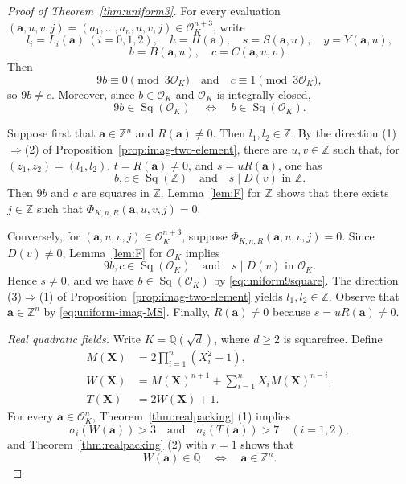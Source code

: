 \documentclass[12pt]{amsart}
\numberwithin{equation}{section}
\theoremstyle{remark}
\theoremstyle{plain}
\newcommand{\Z}{\mathbb{Z}}
\newcommand{\Q}{\mathbb{Q}}
\newcommand{\sO}{\mathcal{O}}
\newcommand{\bX}{\mathbf{X}}
\newcommand{\ba}{\mathbf{a}}
\newcommand{\Sq}[1]{\operatorname{Sq}(#1)}
\begin{document}
\begin{proof}[Proof of Theorem~\ref{thm:uniform3}]
For every evaluation $(\ba,u,v,j)=(a_1,\ldots,a_n,u,v,j)\in\sO_K^{n+3}$, write
\[
l_i=L_i(\ba)\ (i=0,1,2),\quad h=H(\ba),\quad s=S(\ba,u),\quad y=Y(\ba,u),
\]
\[
b=B(\ba,u),\quad c=C(\ba,u,v).
\]
Then
\[
9b\equiv0\pmod{3\sO_K}\quad\text{and}\quad c\equiv1\pmod{3\sO_K},
\]
so $9b\neq c$. Moreover, since $b\in\sO_K$ and $\sO_K$ is integrally closed,
\begin{equation}\label{eq:uniform9square}
9b\in\Sq{\sO_K}\quad\Longleftrightarrow\quad b\in\Sq{\sO_K}.
\end{equation}

Suppose first that $\ba\in\Z^n$ and $R(\ba)\neq0$. Then $l_1,l_2\in\Z$. By the direction \textup{(1)}$\Rightarrow$\textup{(2)} of Proposition~\ref{prop:imag-two-element}, there are $u,v\in\Z$ such that, for
$(z_1,z_2)=(l_1,l_2)$, $t=R(\ba)\neq0$, and $s=uR(\ba)$, one has
\[
b,c\in\Sq{\Z}\quad\text{and}\quad s\mid D(v)\text{ in }\Z.
\]
Then $9b$ and $c$ are squares in $\Z$. Lemma~\ref{lem:F} for $\Z$ shows that there exists $j\in\Z$ such
that $\Phi_{K,n,R}(\ba,u,v,j)=0$.

Conversely, for $(\ba,u,v,j)\in\sO_K^{n+3}$, suppose
$\Phi_{K,n,R}(\ba,u,v,j)=0$. Since $D(v)\neq0$, Lemma~\ref{lem:F} for $\sO_K$ implies
\[
9b,c\in\Sq{\sO_K}\quad\text{and}\quad s\mid D(v)\text{ in }\sO_K.
\]
Hence $s\neq0$, and we have $b\in\Sq{\sO_K}$ by \eqref{eq:uniform9square}. The direction \textup{(3)$\Rightarrow$(1)} of Proposition~\ref{prop:imag-two-element} yields
$l_1,l_2\in\Z$. Observe that $\ba\in\Z^n$ by \eqref{eq:uniform-imag-MS}. Finally, $R(\ba)\neq0$ because $s=uR(\ba)\neq0$.

\smallskip

\noindent\emph{Real quadratic fields.}
Write $K=\Q(\sqrt{d})$, where $d\geq2$ is squarefree. Define
\begin{align*}
M(\bX)&=2\prod_{i=1}^n(X_i^2+1),\\
W(\bX)&=M(\bX)^{n+1}+\sum_{i=1}^nX_iM(\bX)^{n-i},\\
T(\bX)&=2W(\bX)+1.
\end{align*}
For every $\ba\in\sO_K^n$, Theorem~\ref{thm:realpacking} \textup{(1)} implies
\begin{equation}\label{eq:uniform-real-positive}
	\sigma_i(W(\ba))>3\quad\text{and}\quad\sigma_i(T(\ba))>7\quad(i=1,2),
\end{equation}
and Theorem~\ref{thm:realpacking} \textup{(2)} with $r=1$ shows that
\begin{equation}\label{eq:uniform-real-packing}
W(\ba)\in\Q \quad\Longleftrightarrow\quad\ba\in\Z^n.
\end{equation}


\end{proof}
\end{document}
